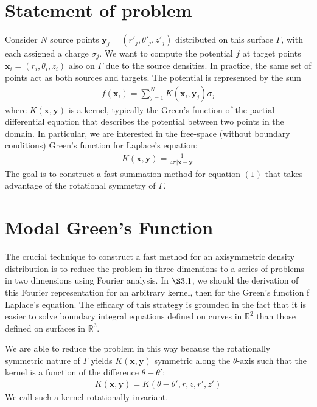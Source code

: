 \documentclass[11pt, oneside]{article}   	%
\begin{document}
\section{Statement of problem}
Consider $N$ source points $\mathbf{y}_j=(r'_j,\theta'_j,z'_j)$ distributed on this surface $\Gamma$, with each assigned a charge $\sigma_j$. We want to compute the potential $f$ at target points $\mathbf{x}_i=(r_i,\theta_i,z_i)$ also on $\Gamma$ due to the source densities.  In practice, the same set of points act as both sources and targets. The potential is represented by the sum
\begin{align}
f(\mathbf{x}_i) = \sum_{j=1}^N K(\mathbf{x}_i,\mathbf{y}_j)\sigma_j
\end{align}
where $K(\mathbf{x},\mathbf{y})$ is a kernel, typically the Green's function of the partial differential equation that describes the potential between two points in the domain. In particular, we are interested in the free-space (without boundary conditions) Green's function for Laplace's equation:
\begin{align}
K(\mathbf{x},\mathbf{y}) = \frac{1}{4\pi |\mathbf{x}-\mathbf{y}|}
\end{align}
The goal is to construct a fast summation method for equation $(1)$ that takes advantage of the rotational symmetry of $\Gamma$.

\section{Modal Green's Function}

The crucial technique to construct a fast method for an axisymmetric density distribution is to reduce the problem in three dimensions to a series of problems in two dimensions using Fourier analysis. In $\S3.1$, we should the derivation of this Fourier representation for an arbitrary kernel, then for the Green's function f Laplace's equation. The efficacy of this strategy is grounded in the fact that it is easier to solve boundary integral equations defined on curves in $\mathbb{R}^2$ than those defined on surfaces in $\mathbb{R}^3$.

We are able to reduce the problem in this way because the rotationally symmetric nature of $\Gamma$ yields $K(\mathbf{x},\mathbf{y})$ symmetric along the $\theta$-axis such that the kernel is a function of the difference $\theta-\theta'$:
\begin{align*}
K(\mathbf{x},\mathbf{y})=K(\theta-\theta',r,z,r',z')
\end{align*}
We call such a kernel rotationally invariant.
\end{document}
